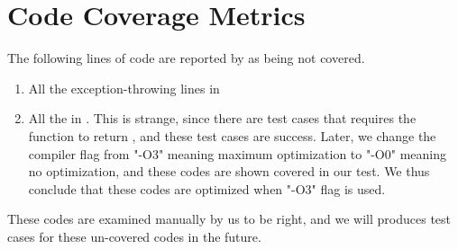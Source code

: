 \documentclass[12pt, titlepage]{article}
\begin{document}
\section{Code Coverage Metrics}
The following lines of code are reported by  as being not covered.
\begin{enumerate}
	\item All the exception-throwing lines in 
	\item All the  in . This is strange, since there are test cases that requires the function to return , and these test cases are success. Later, we change the compiler flag from "-O3" meaning maximum optimization to "-O0" meaning no optimization, and these codes are shown covered in our test. We thus conclude that these codes are optimized when "-O3" flag is used.
\end{enumerate}
These codes are examined manually by us to be right, and we will produces test cases for these un-covered codes in the future.




\end{document}
